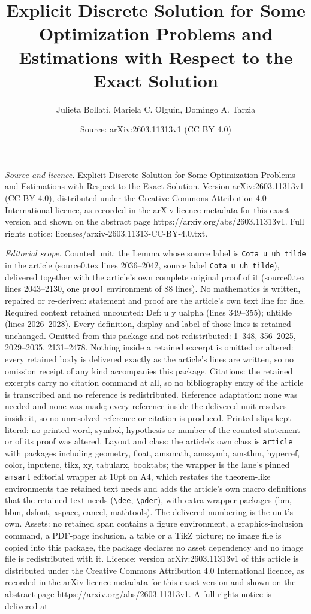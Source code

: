 \documentclass[10pt,a4paper]{amsart}
\title[Explicit Discrete Solution for Some Optimization Problems an]{Explicit Discrete Solution for Some Optimization Problems and Estimations with Respect to the Exact Solution}
\author{Julieta Bollati, Mariela C. Olguin, Domingo A. Tarzia}
\date{Source: arXiv:2603.11313v1 (CC BY 4.0)}
\begin{document}
\maketitle

\noindent\emph{Source and licence.} Explicit Discrete Solution for Some Optimization Problems and Estimations with Respect to the Exact Solution. Version arXiv:2603.11313v1 (CC BY 4.0), distributed under the Creative Commons Attribution 4.0 International licence, as recorded in the arXiv licence metadata for this exact version and shown on the abstract page https://arxiv.org/abs/2603.11313v1. Full rights notice: licenses/arxiv-2603.11313-CC-BY-4.0.txt.\par\smallskip

\noindent\textit{Editorial scope.} Counted unit: the Lemma whose source label is \texttt{Cota u uh tilde} in the article (source0.tex lines 2036--2042, source label \texttt{Cota u uh tilde}), delivered together with the article's own complete original proof of it (source0.tex lines 2043--2130, one \texttt{proof} environment of 88 lines). No mathematics is written, repaired or re-derived: statement and proof are the article's own text line for line. Required context retained uncounted: Def: u y ualpha (lines 349--355); uhtilde (lines 2026--2028). Every definition, display and label of those lines is retained unchanged. Omitted from this package and not redistributed: 1--348, 356--2025, 2029--2035, 2131--2478. Nothing inside a retained excerpt is omitted or altered: every retained body is delivered exactly as the article's lines are written, so no omission receipt of any kind accompanies this package. Citations: the retained excerpts carry no citation command at all, so no bibliography entry of the article is transcribed and no reference is redistributed. Reference adaptation: none was needed and none was made; every reference inside the delivered unit resolves inside it, so no unresolved reference or citation is produced. Printed slips kept literal: no printed word, symbol, hypothesis or number of the counted statement or of its proof was altered. Layout and class: the article's own class is \texttt{article} with packages including geometry, float, amsmath, amssymb, amsthm, hyperref, color, inputenc, tikz, xy, tabularx, booktabs; the wrapper is the lane's pinned \texttt{amsart} editorial wrapper at 10pt on A4, which restates the theorem-like environments the retained text needs and adds the article's own macro definitions that the retained text needs (\texttt{\textbackslash dee}, \texttt{\textbackslash pder}), with extra wrapper packages (bm, bbm, dsfont, xspace, cancel, mathtools). The delivered numbering is the unit's own. Assets: no retained span contains a figure environment, a graphics-inclusion command, a PDF-page inclusion, a table or a TikZ picture; no image file is copied into this package, the package declares no asset dependency and no image file is redistributed with it. Licence: version arXiv:2603.11313v1 of this article is distributed under the Creative Commons Attribution 4.0 International licence, as recorded in the arXiv licence metadata for this exact version and shown on the abstract page https://arxiv.org/abs/2603.11313v1. A full rights notice is delivered at 
\end{document}
